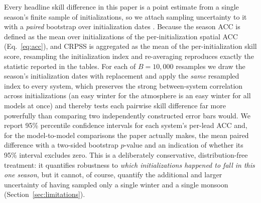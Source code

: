 \documentclass[11pt,a4paper]{article}
\begin{document}
Every headline skill difference in this paper is a point estimate from a single
season's finite sample of initializations, so we attach sampling uncertainty to
it with a \emph{paired} bootstrap over initialization dates
\citep[cf.][]{wilks2019}. Because the season
ACC is defined as the mean over initializations of the per-initialization
spatial ACC (Eq.~\ref{eq:acc}), and CRPSS is aggregated as the mean of the
per-initialization skill score, resampling the initialization index and
re-averaging reproduces exactly the statistic reported in the tables. For each
of $B=10{,}000$ resamples we draw the season's initialization dates with
replacement and apply the \emph{same} resampled index to every system, which
preserves the strong between-system correlation across initializations (an easy
winter for the atmosphere is an easy winter for all models at once) and thereby
tests each pairwise skill difference far more powerfully than comparing two
independently constructed error bars would. We report 95\% percentile
confidence intervals for each system's per-lead ACC and, for the model-to-model
comparisons the paper actually makes, the mean paired difference with a
two-sided bootstrap $p$-value and an indication of whether its 95\% interval
excludes zero. This is a deliberately conservative, distribution-free
treatment: it quantifies robustness to \emph{which initializations happened to
fall in this one season}, but it cannot, of course, quantify the additional and
larger uncertainty of having sampled only a single winter and a single monsoon
(Section~\ref{sec:limitations}).
\end{document}
